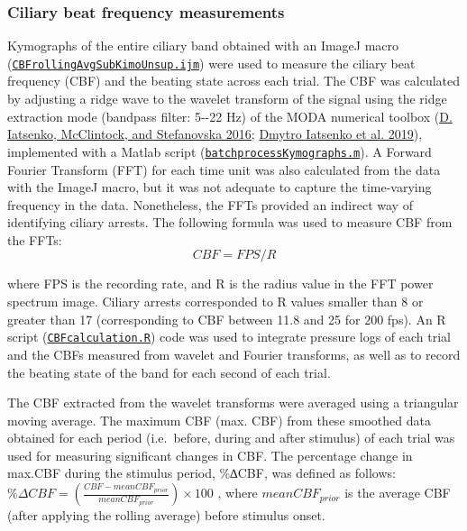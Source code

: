 \documentclass[
]{article}
\begin{document}
\hypertarget{ciliary-beat-frequency-measurements}{%
\subsubsection{Ciliary beat frequency
measurements}\label{ciliary-beat-frequency-measurements}}

Kymographs of the entire ciliary band obtained with an ImageJ macro
(\href{https://github.com/JekelyLab/Bezares_et_al_2023_Pressure/blob/main/Code/CBFmeasurement/CBFrollingAvgSubKimoUnsup.ijm}{\texttt{CBFrollingAvgSubKimoUnsup.ijm}})
were used to measure the ciliary beat frequency (CBF) and the beating
state across each trial. The CBF was calculated by adjusting a ridge
wave to the wavelet transform of the signal using the ridge extraction
mode (bandpass filter: 5-\/-22 Hz) of the MODA numerical toolbox
(\protect\hyperlink{ref-iatsenko2016}{D. Iatsenko, McClintock, and
Stefanovska 2016}; \protect\hyperlink{ref-iatsenko2019}{Dmytro Iatsenko
et al. 2019}), implemented with a Matlab script
(\href{https://github.com/JekelyLab/Bezares_et_al_2023_Pressure/blob/main/Code/CBFmeasurement/batchprocessKymographs.m}{\texttt{batchprocessKymographs.m}}).
A Forward Fourier Transform (FFT) for each time unit was also calculated
from the data with the ImageJ macro, but it was not adequate to capture
the time-varying frequency in the data. Nonetheless, the FFTs provided
an indirect way of identifying ciliary arrests. The following formula
was used to measure CBF from the FFTs: \[ CBF=FPS/R \]

where FPS is the recording rate, and R is the radius value in the FFT
power spectrum image. Ciliary arrests corresponded to R values smaller
than 8 or greater than 17 (corresponding to CBF between 11.8 and 25 for
200 fps). An R script
(\href{https://github.com/JekelyLab/Bezares_et_al_2023_Pressure/blob/main/Code/CBFmeasurement/CBFcalculation.R}{\texttt{CBFcalculation.R}})
code was used to integrate pressure logs of each trial and the CBFs
measured from wavelet and Fourier transforms, as well as to record the
beating state of the band for each second of each trial.

The CBF extracted from the wavelet transforms were averaged using a
triangular moving average. The maximum CBF (max. CBF) from these
smoothed data obtained for each period (i.e.~before, during and after
stimulus) of each trial was used for measuring significant changes in
CBF. The percentage change in max.CBF during the stimulus period,
\%∆CBF, was defined as follows:
\(\%\Delta CBF= (\frac{CBF - meanCBF_{prior}}{meanCBF_{prior}})\times 100\)
, where \(meanCBF_{prior}\) is the average CBF (after applying the
rolling average) before stimulus onset.
\end{document}
